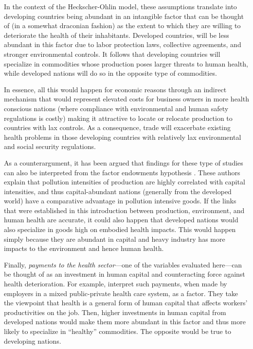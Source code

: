 \documentclass[a4paper,12pt]{article}
\begin{document}
In the context of the Heckscher-Ohlin model, these assumptions translate into developing countries being abundant in an intangible factor that can be thought of (in a somewhat draconian fashion) as the extent to which they are willing to deteriorate the health of their inhabitants.  Developed countries, will be less abundant in this factor due to labor protection laws, collective agreements, and stronger environmental controls. It follows that developing countries will specialize in commodities whose production poses larger threats to human health, while developed nations will do so in the opposite type of commodities.

In essence, all this would happen for economic reasons through an indirect mechanism that would represent elevated costs for business owners in more health conscious nations (where compliance with environmental and human safety regulations is costly) making it attractive to locate or relocate production to countries with lax controls. As a consequence, trade will exacerbate existing health problems in those developing countries with relatively lax environmental and social security regulations. 

As a counterargument, it has been argued that findings for these type of studies can also be interpreted from the factor endowments hypothesis \citep{dietzenbacherempirical2007}. These authors explain that pollution intensities of production are highly correlated with capital intensities, and thus capital-abundant nations (generally from the developed world) have a comparative advantage in pollution intensive goods. If the links that were established in this introduction between production, environment, and human health are accurate, it could also happen that developed nations would also specialize in goods high on embodied health impacts. This would happen simply because they are abundant in capital and heavy industry has more impacts to the environment and hence human health.

Finally, \textit{payments to the health sector}---one of the variables evaluated here---can be thought of as an investment in human capital and counteracting force against health deterioration. For example, \citet{fangGavazza2011} interpret such payments, when made by employers in a mixed public-private health care system, as a factor. They take the viewpoint that health is a general form of human capital that affects workers' productivities on the job. Then, higher investments in human capital from developed nations would make them more abundant in this factor and thus more likely to specialize in ``healthy'' commodities. The opposite would be true to developing nations.
\end{document}
